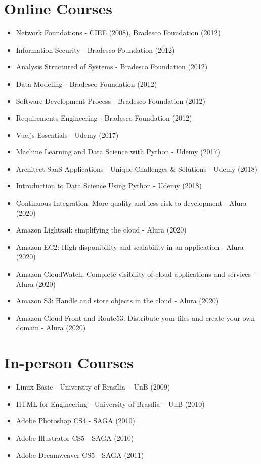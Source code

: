 \section{Online Courses}
\begin{itemize}
    \item Network Foundations - CIEE (2008), Bradesco Foundation (2012)
    \item Information Security - Bradesco Foundation (2012)
    \item Analysis Structured of Systems - Bradesco Foundation (2012)
    \item Data Modeling - Bradesco Foundation (2012)
    \item Software Development Process - Bradesco Foundation (2012)
    \item Requirements Engineering - Bradesco Foundation (2012)
    \item Vue.js Essentials - Udemy (2017)
    \item Machine Learning and Data Science with Python - Udemy (2017)
    \item Architect SaaS Applications - Unique Challenges & Solutions - Udemy (2018)
    \item Introduction to Data Science Using Python - Udemy (2018)
    \item Continuous Integration: More quality and less risk to development - Alura (2020)
    \item Amazon Lightsail: simplifying the cloud - Alura (2020)
    \item Amazon EC2: High disponibility and scalability in an application - Alura (2020)
    \item Amazon CloudWatch: Complete visibility of cloud applications and services - Alura (2020)
    \item Amazon S3: Handle and store objects in the cloud - Alura (2020)
    \item Amazon Cloud Front and Route53: Distribute your files and create your own domain - Alura (2020)
\end{itemize}

\section{In-person Courses}
\begin{itemize}
    \item Linux Basic - University of Brasília – UnB (2009)
    \item HTML for Engineering - University of Brasília – UnB (2010)
    \item Adobe Photoshop CS4 - SAGA (2010)
    \item Adobe Illustrator CS5 - SAGA (2010)
    \item Adobe Dreamweaver CS5 - SAGA (2011)
\end{itemize}